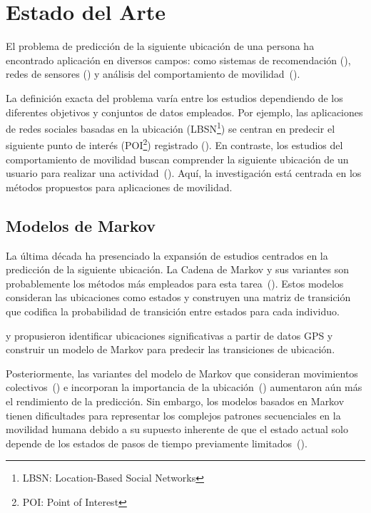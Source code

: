 \chapter{Estado del Arte}\label{chapter:state-of-the-art}
El problema de predicción de la siguiente ubicación de una persona ha encontrado 
aplicación en diversos campos: como sistemas de recomendación (\cite{xue2021mobtcast}), 
redes de sensores (\cite{pirozmand2014human}) y análisis del comportamiento de movilidad~(\cite{wang2021reinforced,xu2022understanding}). 

La definición exacta del problema varía entre los estudios dependiendo de 
los diferentes objetivos y conjuntos de datos empleados. Por ejemplo, 
las aplicaciones de redes sociales basadas en la ubicación (LBSN\footnote{LBSN: Location-Based Social Networks}) se 
centran en predecir el siguiente punto de interés (POI\footnote{POI: Point of Interest}) 
registrado (\cite{wang2022online,xue2021mobtcast}). En contraste, los estudios del comportamiento 
de movilidad buscan comprender la siguiente ubicación de un usuario para 
realizar una actividad~(\cite{solomon2021analyzing}). Aquí, la investigación est\'a centrada en los métodos 
propuestos para aplicaciones de movilidad.

\section{Modelos de Markov}
La última década ha presenciado la expansión de estudios centrados en la 
predicción de la siguiente ubicación. La Cadena de Markov y sus variantes 
son probablemente los métodos más empleados para esta tarea~(\cite{luca2021survey}). 
Estos modelos consideran las ubicaciones como estados y construyen una 
matriz de transición que codifica la probabilidad de transición entre 
estados para cada individuo. 

\cite{ashbrook2002learning} y \cite{gambs2012next} propusieron identificar ubicaciones significativas 
 a partir de datos GPS y construir un modelo de Markov para predecir 
 las transiciones de ubicación. 
 
 Posteriormente, las variantes del 
 modelo de Markov que consideran movimientos colectivos~(\cite{chen2014nlpm}) e 
 incorporan la importancia de la ubicación~(\cite{huang2017mining}) aumentaron aún 
 más el rendimiento de la predicción. Sin embargo, los modelos basados
en Markov tienen dificultades para representar los complejos patrones
secuenciales en la movilidad humana debido a su supuesto inherente 
de que el estado actual solo depende de los estados de pasos de tiempo
 previamente limitados~(\cite{li2020hierarchical}).

